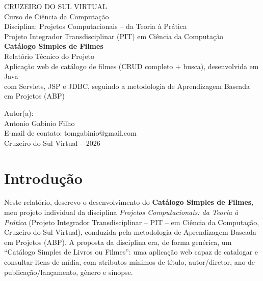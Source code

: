 \documentclass[12pt,a4paper]{article}
\begin{document}
\begin{titlepage}
    \centering
    \vspace*{1.5cm}

    {\large CRUZEIRO DO SUL VIRTUAL}\\[0.3cm]
    {\large Curso de Ciência da Computação}\\[0.3cm]
    {\large Disciplina: Projetos Computacionais -- da Teoria à Prática}\\[0.3cm]
    {\large Projeto Integrador Transdisciplinar (PIT) em Ciência da Computação}\\[2.5cm]

    {\Huge\bfseries Catálogo Simples de Filmes}\\[0.6cm]
    {\Large Relatório Técnico do Projeto}\\[2.5cm]

    {\large Aplicação web de catálogo de filmes (CRUD completo + busca), desenvolvida em Java\\
    com Servlets, JSP e JDBC, seguindo a metodologia de Aprendizagem Baseada em Projetos (ABP)}\\[3cm]

    \vfill

    {\large Autor(a):}\\[0.15cm]
    {\fontsize{28}{32}\selectfont Antonio Gabinio Filho}\\[0.4cm]
    {\large E-mail de contato: tomgabinio@gmail.com}\\[0.4cm]
    {\large Cruzeiro do Sul Virtual -- 2026}

\end{titlepage}

\tableofcontents
\newpage

\section{Introdução}

Neste relatório, descrevo o desenvolvimento do \textbf{Catálogo Simples de Filmes}, meu projeto
individual da disciplina \textit{Projetos Computacionais: da Teoria à Prática} (Projeto
Integrador Transdisciplinar -- PIT -- em Ciência da Computação, Cruzeiro do Sul Virtual),
conduzida pela metodologia de Aprendizagem Baseada em Projetos (ABP). A proposta da disciplina
era, de forma genérica, um ``Catálogo Simples de Livros ou Filmes'': uma aplicação web capaz de
catalogar e consultar itens de mídia, com atributos mínimos de título, autor/diretor, ano de
publicação/lançamento, gênero e sinopse.
\end{document}
